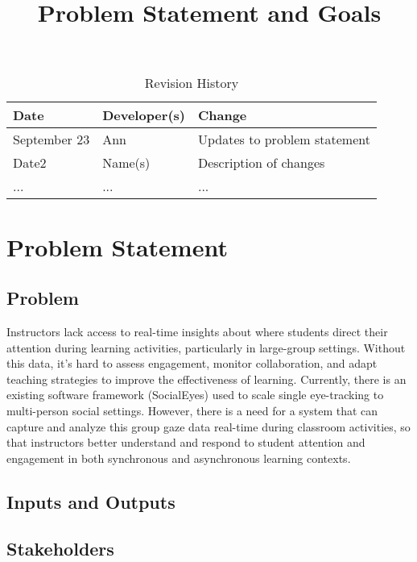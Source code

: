 \documentclass{article}
\title{Problem Statement and Goals\\\progname}
\author{\authname}
\date{}
\begin{document}
\maketitle

\begin{table}[hp]
\caption{Revision History} \label{TblRevisionHistory}
\begin{tabularx}{\textwidth}{llX}
\toprule
\textbf{Date} & \textbf{Developer(s)} & \textbf{Change}\\
\midrule
September 23 & Ann & Updates to problem statement\\
Date2 & Name(s) & Description of changes\\
... & ... & ...\\
\bottomrule
\end{tabularx}
\end{table}

\section{Problem Statement}
\subsection{Problem}
Instructors lack access to real-time insights about where students direct their attention during learning activities, particularly in large-group settings. Without this data, it's hard to assess engagement, monitor collaboration, and adapt teaching strategies to improve the effectiveness of learning. Currently, there is an existing software framework (SocialEyes) used to scale single eye-tracking to multi-person social settings. However, there is a need for a system that can capture and analyze this group gaze data real-time during classroom activities, so that instructors better understand and respond to student attention and engagement in both synchronous and asynchronous learning contexts. 


\subsection{Inputs and Outputs}


\subsection{Stakeholders}
\end{document}
